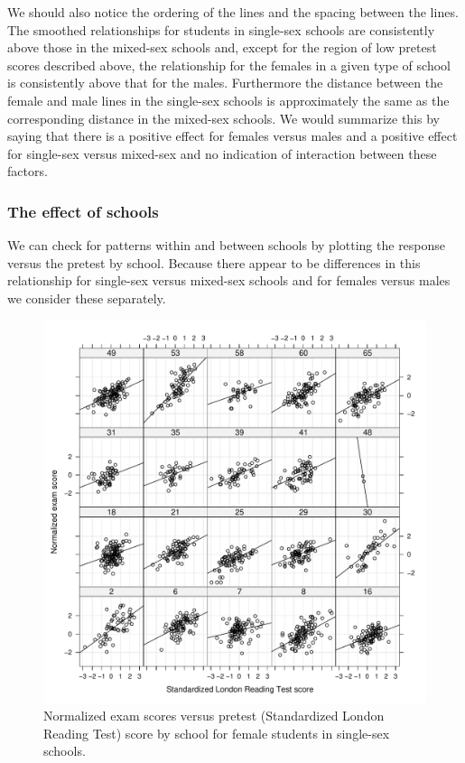 \documentclass[12pt]{article}
\begin{document}
We should also notice the ordering of the lines and the spacing
between the lines.  The smoothed relationships for students in
single-sex schools are consistently above those in the mixed-sex
schools and, except for the region of low pretest scores described
above, the relationship for the females in a given type of school is
consistently above that for the males.  Furthermore the distance
between the female and male lines in the single-sex schools is
approximately the same as the corresponding distance in the mixed-sex
schools.  We would summarize this by saying that there is a positive
effect for females versus males and a positive effect for single-sex
versus mixed-sex and no indication of interaction between these
factors.


\subsubsection{The effect of schools}
\label{sec:schoolEffects}

We can check for patterns within and between schools by plotting the
response versus the pretest by school.  Because there appear to be
differences in this relationship for single-sex versus mixed-sex
schools and for females versus males we consider these separately.
\begin{figure}[tbp]
  \centering
  \includegraphics[width=\textwidth]{figs/SoftRev-Examplot3}
  \caption{Normalized exam scores versus pretest (Standardized London
    Reading Test) score by school for female students in single-sex
    schools.}
  \label{fig:Examplot3}
\end{figure}
\end{document}
